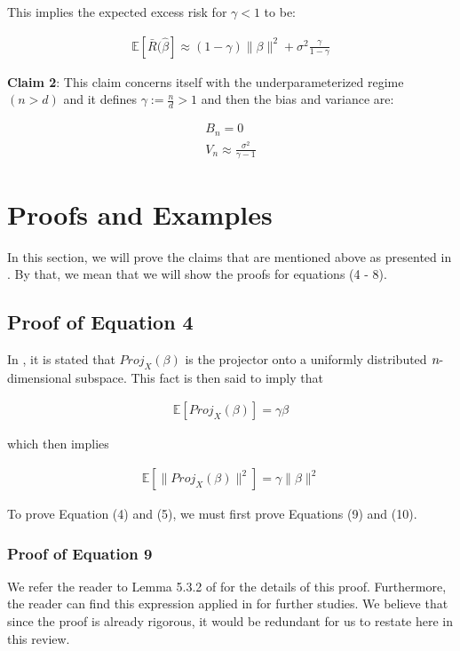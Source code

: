 \documentclass{article}
\begin{document}
This implies the expected excess risk for $\gamma < 1$ to be:

\begin{align}
    \mathbb{E} [\bar{R}(\hat{\beta}] \approx (1-\gamma)\|\beta\|^2 + \sigma^2 \frac{\gamma}{1-\gamma}
\end{align}

\textbf{Claim 2}: This claim concerns itself with the underparameterized regime $( n > d)$ and it defines $\gamma := \frac{n}{d} > 1$ and then the bias and variance are:

\begin{align}
    B_n = 0 \\
    V_n \approx \frac{\sigma^2}{\gamma - 1}
\end{align}

\section{Proofs and Examples}

In this section, we will prove the claims that are mentioned above as presented in \cite{Nakkiran_2019}. By that, we mean that we will show the proofs for equations (4 - 8).

\subsection{Proof of Equation 4}

In \cite{Nakkiran_2019}, it is stated that $Proj_X (\beta)$ is the projector onto a uniformly distributed $\emph{n}$-dimensional subspace. This fact is then said to imply that

\begin{align}
    \mathbb{E}[Proj_X (\beta)] = \gamma \beta
\end{align}

which then implies 

\begin{align}
    \mathbb{E} [\|Proj_X (\beta)\|^2] = \gamma \|\beta\|^2
\end{align}

To prove Equation (4) and (5), we must first prove Equations (9) and (10).

\subsubsection{Proof of Equation 9}

We refer the reader to Lemma 5.3.2 of \cite{vershynin_2018} for the details of this proof. Furthermore, the reader can find this expression applied in \cite{Ribeiro_2023} for further studies. We believe that since the proof is already rigorous, it would be redundant for us to restate here in this review. 
\end{document}
